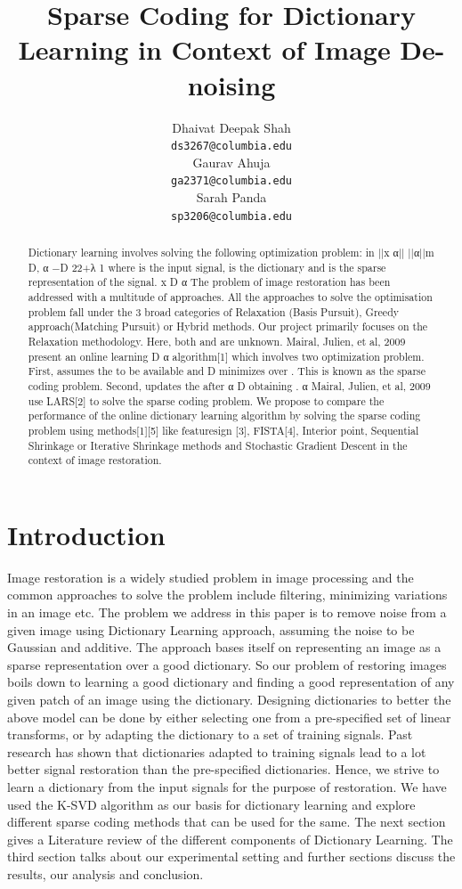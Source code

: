 \documentclass{article} %
\title{Sparse Coding for Dictionary Learning in Context of Image De-noising}
\author{
Dhaivat Deepak Shah\\
\texttt{ds3267@columbia.edu} \\
\And
Gaurav Ahuja\\
\texttt{ga2371@columbia.edu} \\
\And
Sarah Panda\\
\texttt{sp3206@columbia.edu} \\
}
\begin{document}
\maketitle


\begin{abstract}
Dictionary learning involves solving the following optimization problem: in 
||x α|| ||α||m D, α −D 22+λ 1 where  is the input signal,   is the dictionary and   is the sparse representation of the signal. 
x D α  
The problem of image restoration has been addressed with a multitude of approaches. All the approaches to solve the optimisation problem fall under the 3 broad categories of  Relaxation (Basis Pursuit), Greedy approach(Matching Pursuit) or Hybrid methods. Our project  primarily focuses on the Relaxation methodology.
Here, both   and   are unknown.  Mairal, Julien, et al, 2009 present an online learning D α   algorithm[1] which involves two optimization problem. First, assumes the   to be available and D   minimizes over . This is known as the sparse coding problem. Second, updates the   after α D   obtaining  . α  
Mairal, Julien, et al, 2009 use LARS[2]  to solve the sparse coding problem. We propose to  compare the performance of the online dictionary learning algorithm by solving the sparse coding  problem using methods[1][5] like feature­sign [3], FISTA[4], Interior point, Sequential Shrinkage or  Iterative Shrinkage methods and Stochastic Gradient Descent in the context of image  restoration.
\end{abstract}

\vspace{-.2cm}
\section{Introduction}
\vspace{-.2cm}
Image restoration is a widely studied problem in image processing and the common approaches to solve the problem include filtering, minimizing variations in an image etc. The problem we address in this paper is to remove noise from a given image using Dictionary Learning approach, assuming the noise to be Gaussian and additive. The approach bases itself on representing an image as a sparse representation over a good dictionary. So our problem of restoring images boils down to learning a good dictionary and finding a good representation of any given patch of an image using the dictionary. Designing dictionaries to better the above model can be done by either selecting one from a pre-specified set of linear transforms, or by adapting the dictionary to a set of training signals. Past research has shown that dictionaries adapted to training signals lead to a lot better signal restoration than the pre-specified dictionaries. Hence, we strive to learn a dictionary from the input signals for the purpose of restoration. We have used the K-SVD algorithm as our basis for dictionary learning and explore different sparse coding methods that can be used for the same. The next section gives a Literature review of the different components of Dictionary Learning. The third section talks about our experimental setting and further sections discuss the results, our analysis and conclusion. 
\end{document}
